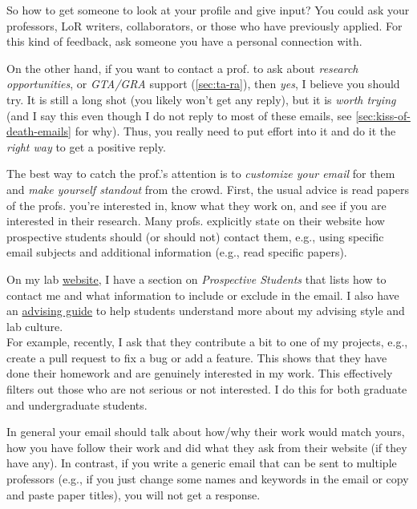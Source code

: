 \documentclass[oneside,11pt]{book}
\newenvironment{commentbox}[1][]{
  \small
  \begin{marker}[\faChessPawn{}]
    {\textbf{#1}}
  }{
  \end{marker}
}
\begin{document}
So how to get someone to look at your profile and give input? You could ask your professors, LoR writers, collaborators, or those who have previously applied. For this kind of feedback, ask someone you have a personal connection with.

On the other hand, if you want to contact a prof. to ask about \emph{research opportunities}, or \emph{GTA/GRA} support (\autoref{sec:ta-ra}), then \emph{yes}, I believe you should try.
It is still a long shot (you likely won't get any reply), but it is \emph{worth trying} (and I say this even though I do not reply to most of these emails, see \autoref{sec:kiss-of-death-emails} for why). 
Thus, you really need to put effort into it and do it the \emph{right way} to get a positive reply.

The best way to catch the prof.'s attention is to \emph{customize your email} for them and \emph{make yourself standout} from the crowd.
First, the usual advice is read papers of the profs. you're interested in, know what they work on, and see if you are interested in their research.  Many profs. explicitly state on their website how prospective students should (or should not) contact them, e.g., using specific email subjects and additional information (e.g., read specific papers). 

\begin{commentbox}
    On my lab \href{https://roars.dev}{website}, I have a section on \emph{Prospective Students} that lists how to contact me and what information to include or exclude in the email. I also have an \href{https://roars.dev/phd-cs-us/advising.pdf}{advising guide} to help students understand more about my advising style and lab culture.\\
    
    For example, recently, I ask that they contribute a bit to one of my projects, e.g., create a pull request to fix a bug or add a feature. This shows that they have done their homework and are genuinely interested in my work. This effectively filters out those who are not serious or not interested. I do this for both graduate and undergraduate students.
\end{commentbox}

In general your email should talk about how/why their work would match yours, how you have follow their work and did what they ask from their website (if they have any).
In contrast, if you write a generic email that can be sent to multiple professors (e.g., if you just change some names and keywords in the email or copy and paste paper titles), you will not get a response.
\end{document}
